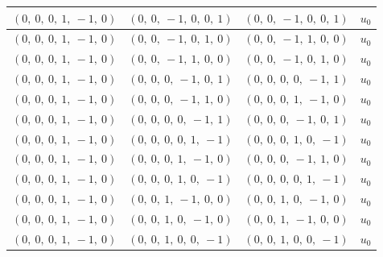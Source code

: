 \documentclass[11pt]{article}
\theoremstyle{definition}
\begin{document}
\begin{longtable}{|l|l|l|c|}
    \hline
    $\left( 0, \  0, \  0, \  1, \  -1, \  0\right)$ & $\left( 0, \  0, \  -1, \  0, \  0, \  1\right)$ & $\left( 0, \  0, \  -1, \  0, \  0, \  1\right)$ & $u_{0}$ \\
    \hline
    $\left( 0, \  0, \  0, \  1, \  -1, \  0\right)$ & $\left( 0, \  0, \  -1, \  0, \  1, \  0\right)$ & $\left( 0, \  0, \  -1, \  1, \  0, \  0\right)$ & $u_{0}$ \\
    \hline
    $\left( 0, \  0, \  0, \  1, \  -1, \  0\right)$ & $\left( 0, \  0, \  -1, \  1, \  0, \  0\right)$ & $\left( 0, \  0, \  -1, \  0, \  1, \  0\right)$ & $u_{0}$ \\
    \hline
    $\left( 0, \  0, \  0, \  1, \  -1, \  0\right)$ & $\left( 0, \  0, \  0, \  -1, \  0, \  1\right)$ & $\left( 0, \  0, \  0, \  0, \  -1, \  1\right)$ & $u_{0}$ \\
    \hline
    $\left( 0, \  0, \  0, \  1, \  -1, \  0\right)$ & $\left( 0, \  0, \  0, \  -1, \  1, \  0\right)$ & $\left( 0, \  0, \  0, \  1, \  -1, \  0\right)$ & $u_{0}$ \\
    \hline
    $\left( 0, \  0, \  0, \  1, \  -1, \  0\right)$ & $\left( 0, \  0, \  0, \  0, \  -1, \  1\right)$ & $\left( 0, \  0, \  0, \  -1, \  0, \  1\right)$ & $u_{0}$ \\
    \hline
    $\left( 0, \  0, \  0, \  1, \  -1, \  0\right)$ & $\left( 0, \  0, \  0, \  0, \  1, \  -1\right)$ & $\left( 0, \  0, \  0, \  1, \  0, \  -1\right)$ & $u_{0}$ \\
    \hline
    $\left( 0, \  0, \  0, \  1, \  -1, \  0\right)$ & $\left( 0, \  0, \  0, \  1, \  -1, \  0\right)$ & $\left( 0, \  0, \  0, \  -1, \  1, \  0\right)$ & $u_{0}$ \\
    \hline
    $\left( 0, \  0, \  0, \  1, \  -1, \  0\right)$ & $\left( 0, \  0, \  0, \  1, \  0, \  -1\right)$ & $\left( 0, \  0, \  0, \  0, \  1, \  -1\right)$ & $u_{0}$ \\
    \hline
    $\left( 0, \  0, \  0, \  1, \  -1, \  0\right)$ & $\left( 0, \  0, \  1, \  -1, \  0, \  0\right)$ & $\left( 0, \  0, \  1, \  0, \  -1, \  0\right)$ & $u_{0}$ \\
    \hline
    $\left( 0, \  0, \  0, \  1, \  -1, \  0\right)$ & $\left( 0, \  0, \  1, \  0, \  -1, \  0\right)$ & $\left( 0, \  0, \  1, \  -1, \  0, \  0\right)$ & $u_{0}$ \\
    \hline
    $\left( 0, \  0, \  0, \  1, \  -1, \  0\right)$ & $\left( 0, \  0, \  1, \  0, \  0, \  -1\right)$ & $\left( 0, \  0, \  1, \  0, \  0, \  -1\right)$ & $u_{0}$ \\

\end{longtable}
\end{document}
